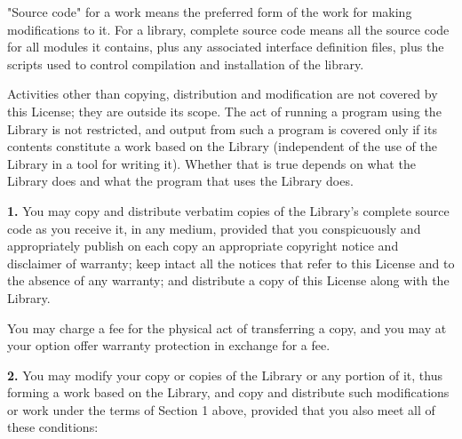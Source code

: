 "Source code" for a work means the preferred form of the work for making
modifications to it. For a library, complete source code means all the source
code for all modules it contains, plus any associated interface definition
files, plus the scripts used to control compilation and installation of the
library. 

Activities other than copying, distribution and modification are not covered
by this License; they are outside its scope. The act of running a program
using the Library is not restricted, and output from such a program is covered
only if its contents constitute a work based on the Library (independent of
the use of the Library in a tool for writing it). Whether that is true depends
on what the Library does and what the program that uses the Library does. 

{\bf 1.} You may copy and distribute verbatim copies of the Library's complete
source code as you receive it, in any medium, provided that you conspicuously
and appropriately publish on each copy an appropriate copyright notice and
disclaimer of warranty; keep intact all the notices that refer to this License
and to the absence of any warranty; and distribute a copy of this License
along with the Library. 

You may charge a fee for the physical act of transferring a copy, and you may
at your option offer warranty protection in exchange for a fee. 

{\bf 2.} You may modify your copy or copies of the Library or any portion of
it, thus forming a work based on the Library, and copy and distribute such
modifications or work under the terms of Section 1 above, provided that you
also meet all of these conditions: 

